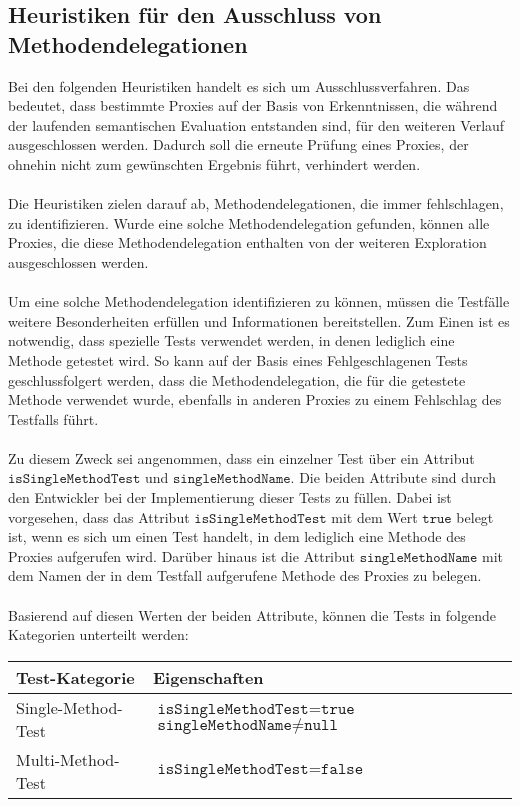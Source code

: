 \subsection{Heuristiken für den Ausschluss von Methodendelegationen}
Bei den folgenden Heuristiken handelt es sich um Ausschlussverfahren. Das bedeutet, dass bestimmte Proxies auf der Basis von Erkenntnissen, die während der laufenden semantischen Evaluation entstanden sind, für den weiteren Verlauf ausgeschlossen werden. Dadurch soll die erneute Prüfung eines Proxies, der ohnehin nicht zum gewünschten Ergebnis führt, verhindert werden.
\\\\
Die Heuristiken zielen darauf ab, Methodendelegationen, die immer fehlschlagen, zu identifizieren. Wurde eine solche Methodendelegation gefunden, können alle Proxies, die diese Methodendelegation enthalten von der weiteren Exploration ausgeschlossen werden.
\\\\
Um eine solche Methodendelegation identifizieren zu können, müssen die Testfälle weitere Besonderheiten erfüllen und Informationen bereitstellen. Zum Einen ist es notwendig, dass spezielle Tests verwendet werden, in denen lediglich eine Methode getestet wird. So kann auf der Basis eines Fehlgeschlagenen Tests geschlussfolgert werden, dass die Methodendelegation, die für die getestete Methode verwendet wurde, ebenfalls in anderen Proxies zu einem Fehlschlag des Testfalls führt.
\\\\
Zu diesem Zweck sei angenommen, dass ein einzelner Test über ein Attribut $\texttt{isSingleMethodTest}$ und $\texttt{singleMethodName}$. Die beiden Attribute sind durch den Entwickler bei der Implementierung dieser Tests zu füllen. Dabei ist vorgesehen, dass das Attribut $\texttt{isSingleMethodTest}$ mit dem Wert $\texttt{true}$ belegt ist, wenn es sich um einen Test handelt, in dem lediglich eine Methode des Proxies aufgerufen wird. Darüber hinaus ist die Attribut $\texttt{singleMethodName}$ mit dem Namen der in dem Testfall aufgerufene Methode des Proxies zu belegen.
\\\\
Basierend auf diesen Werten der beiden Attribute, können die Tests in folgende Kategorien unterteilt werden:
\begin{table}[H]
\centering
\begin{tabular}{|p{5.5cm}|p{6.5cm}|}
\hline
\hline
\textbf{Test-Kategorie} & \textbf{Eigenschaften} \\
\hline
Single-Method-Test 
& 
$\texttt{isSingleMethodTest} = \texttt{true}$\newline
$\texttt{singleMethodName} \neq \texttt{null}$ \\
\hline
Multi-Method-Test 
& 
$\texttt{isSingleMethodTest} = \texttt{false}$\\
\hline
\hline
\end{tabular}

\end{table}
